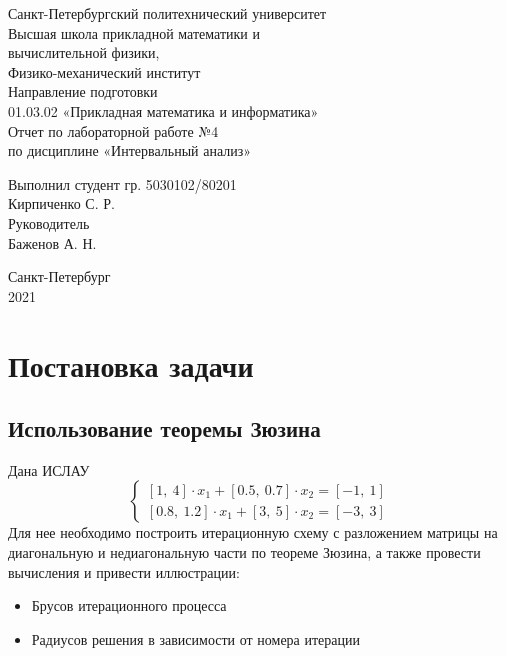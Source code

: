 \documentclass[a4paper]{article}
\begin{document}
\large
\begin{center}
    Санкт-Петербургский политехнический университет\\
    Высшая школа прикладной математики и\\вычислительной физики,\\ 
    Физико-механический институт\\
    \vspace{3em}
    Направление подготовки\\
    01.03.02 «Прикладная математика и информатика»\\
    \vspace{10em}
    \Large
    Отчет по лабораторной работе №4 \\
    по дисциплине «Интервальный анализ»
    \vspace{19em}
    \large
\end{center}
Выполнил студент гр. 5030102/80201\\
Кирпиченко С. Р.\\
Руководитель\\
Баженов А. Н.
\vspace{10em}
\begin{center}
    Санкт-Петербург\\
    2021
\end{center}
\thispagestyle{empty}
\newpage
\tableofcontents
{}
\newpage
\listoffigures
{}
\newpage
\section{Постановка задачи}
\subsection{Использование теоремы Зюзина}
Дана ИСЛАУ 
\begin{equation}\label{islau zuzin}
    \begin{cases}
    [1,\:4]\cdot x_1+[0.5,\:0.7]\cdot x_2=[-1,\:1]\\
    [0.8,\:1.2]\cdot x_1 + [3,\:5]\cdot x_2=[-3,\:3]
    \end{cases}
\end{equation}
Для нее необходимо построить итерационную схему с разложением матрицы на диагональную и недиагональную части по теореме Зюзина, а также провести вычисления и привести иллюстрации:
\begin{itemize}
    \item Брусов итерационного процесса
    \item Радиусов решения в зависимости от номера итерации
\end{itemize}
\end{document}
